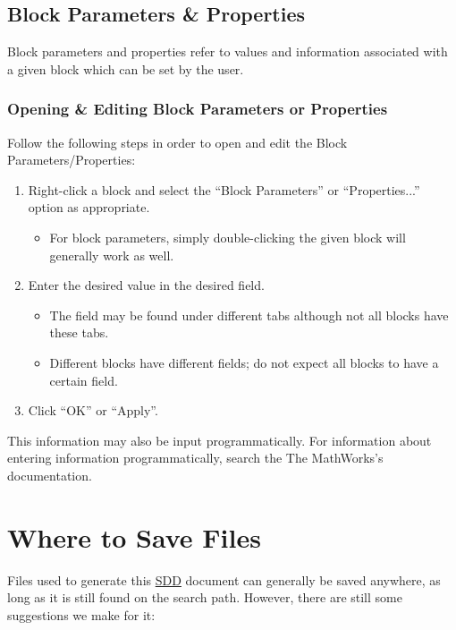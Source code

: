 \documentclass{mcscert}
\newcommand{\mathworks}{The MathWorks}
\begin{document}
	\subsection{Block Parameters \& Properties} 
	\label{ssec:blkpar-prop}
	Block parameters and properties refer to values and information associated with a given block which can be set by the user.
        
	\subsubsection{Opening \& Editing Block Parameters or Properties}
	\label{sssec:edit-blkpar-prop}
  
	Follow the following steps in order to open and edit the Block Parameters/Properties:
	\begin{enumerate}
		\item Right-click a block and select the ``Block Parameters'' or ``Properties...'' option as appropriate.
		\begin{itemize}
			\item For block parameters, simply double-clicking the given block will generally work as well.
		\end{itemize}
			\item Enter the desired value in the desired field.
		\begin{itemize}
			\item The field may be found under different tabs although not all blocks have these tabs.
			\item Different blocks have different fields; do not expect all blocks to have a certain field.
		\end{itemize}
		\item Click ``OK'' or ``Apply''.
	\end{enumerate}
	This information may also be input programmatically. 
	For information about entering information programmatically, search the \mathworks{}'s documentation.

\section{Where to Save Files} 
\label{sec:where-save}
Files used to generate this \hyperref[acr:sdd]{SDD} document can generally be saved anywhere, as long as it is still found on the \matlab{} search path. 
However, there are still some suggestions we make for it:
  
\end{document}
